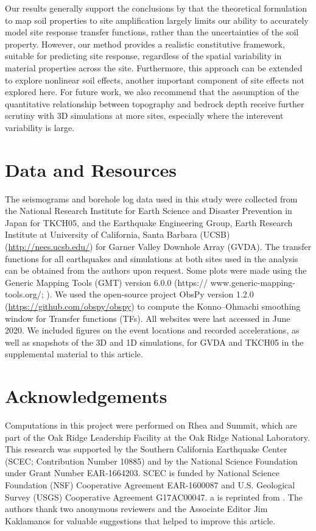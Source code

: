 Our results generally support the conclusions by \citet{thompsonImpedimentsPredictingSite2009} that the theoretical formulation to map soil properties to site amplification largely limits our ability to accurately model site response transfer functions, rather than the uncertainties of the soil property. However, our method provides a realistic constitutive framework, suitable for predicting site response, regardless of the spatial variability in material properties across the site. Furthermore, this approach can be extended to explore nonlinear soil effects, another important component of site effects not explored here. For future work, we also recommend that the assumption of the quantitative relationship between topography and bedrock depth receive further scrutiny with 3D simulations at more sites, especially where the interevent variability is large.

\section*{Data and Resources}
The seismograms and borehole log data used in this study were collected from the National Research Institute for Earth Science and Disaster Prevention \citep{nationalresearchinstituteforearthscienceanddisasterresilienceNIEDKNETKiKnet2019} in Japan for TKCH05, and the Earthquake Engineering Group, Earth Research Institute at University of California, Santa Barbara (UCSB) (\url{http://nees.ucsb.edu/}) for Garner Valley Downhole Array (GVDA). The transfer functions for all earthquakes and simulations at both sites used in the analysis can be obtained from the authors upon request. Some plots were made using the Generic Mapping Tools (GMT) version 6.0.0 (https:// www.generic-mapping-tools.org/; \citealt{wesselGenericMappingTools2019}). We used the open-source project ObsPy version 1.2.0 (\url{https://github.com/obspy/obspy}) to compute the Konno–Ohmachi smoothing window for Transfer functions (TFs). All websites were last accessed in June 2020. We included figures on the event locations and recorded accelerations, as well as snapshots of the 3D and 1D simulations, for GVDA and TKCH05 in the supplemental material to this article.

\section*{Acknowledgements}

Computations in this project were performed on Rhea and Summit, which are part of the Oak Ridge Leadership Facility at the Oak Ridge National Laboratory. This research was supported by the Southern California Earthquake Center (SCEC; Contribution Number 10885) and by the National Science Foundation under Grant Number EAR-1664203. SCEC is funded by National Science Foundation (NSF) Cooperative Agreement EAR-1600087 and U.S. Geological Survey (USGS) Cooperative Agreement G17AC00047. a is reprinted from \citet{thompsonTaxonomySiteResponse2012}. The authors thank two anonymous reviewers and the Associate Editor Jim Kaklamanos for valuable suggestions that helped to improve this article.

